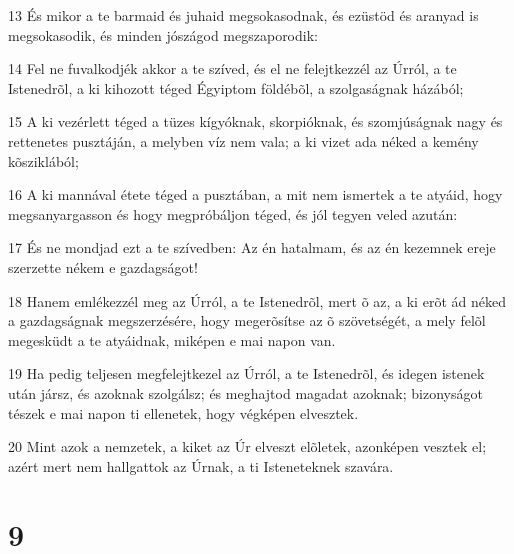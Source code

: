 \par 13 És mikor a te barmaid és juhaid megsokasodnak, és ezüstöd és aranyad is megsokasodik, és minden jószágod megszaporodik:
\par 14 Fel ne fuvalkodjék akkor a te szíved, és el ne felejtkezzél az Úrról, a te Istenedrõl, a ki kihozott téged Égyiptom földébõl, a szolgaságnak házából;
\par 15 A ki vezérlett téged a tüzes kígyóknak, skorpióknak, és szomjúságnak nagy és rettenetes pusztáján, a melyben víz nem vala; a ki vizet ada néked a kemény kõsziklából;
\par 16 A ki mannával étete téged a pusztában, a mit nem ismertek a te atyáid, hogy megsanyargasson és hogy megpróbáljon  téged, és jól tegyen veled azután:
\par 17 És ne mondjad ezt a te szívedben: Az én hatalmam, és az én kezemnek ereje szerzette nékem e gazdagságot!
\par 18 Hanem emlékezzél meg az Úrról, a te Istenedrõl, mert õ az, a ki erõt ád néked a gazdagságnak megszerzésére, hogy megerõsítse az õ szövetségét, a mely felõl megesküdt a te atyáidnak, miképen e mai napon van.
\par 19 Ha pedig teljesen megfelejtkezel az Úrról, a te Istenedrõl, és idegen istenek után jársz, és azoknak szolgálsz; és meghajtod magadat azoknak; bizonyságot tészek e mai napon ti ellenetek, hogy végképen elvesztek.
\par 20 Mint azok a nemzetek, a kiket az Úr elveszt elõletek, azonképen vesztek el; azért mert nem hallgattok az Úrnak, a ti Isteneteknek szavára.

\chapter{9}

